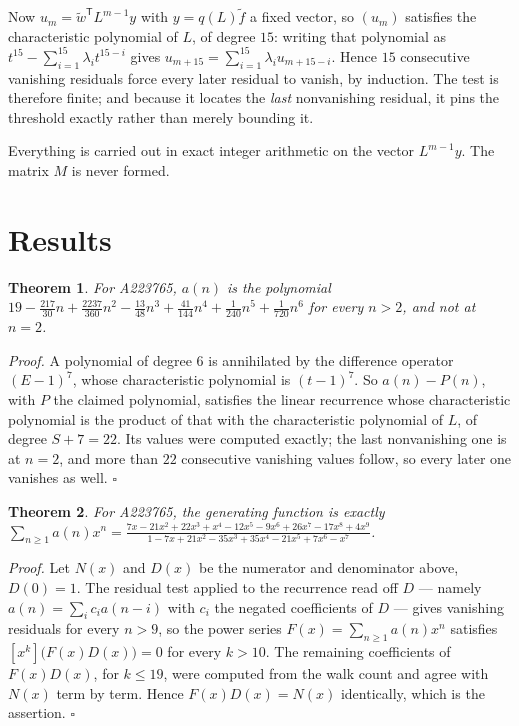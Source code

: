 \documentclass[11pt]{article}
\newtheorem{theorem}{Theorem}
\theoremstyle{definition}
\begin{document}
Now $u_m = \tilde w^{\mathsf T} L^{m-1} y$ with $y = q(L)\tilde f$ a fixed vector, so $(u_m)$ satisfies the characteristic polynomial of $L$, of degree $15$: writing that polynomial as $t^{15} - \sum_{i=1}^{15} \lambda_i t^{15-i}$ gives $u_{m+15} = \sum_{i=1}^{15} \lambda_i u_{m+15-i}$. Hence $15$ consecutive vanishing residuals force every later residual to vanish, by induction. The test is therefore finite; and because it locates the {\itshape last} nonvanishing residual, it pins the threshold exactly rather than merely bounding it.

Everything is carried out in exact integer arithmetic on the vector $L^{m-1}y$. The matrix $M$ is never formed.

\section{Results}

\begin{theorem} For A223765, $a(n)$ is the polynomial $19 - \frac{217}{30}n + \frac{2237}{360}n^{2} - \frac{13}{48}n^{3} + \frac{41}{144}n^{4} + \frac{1}{240}n^{5} + \frac{1}{720}n^{6}$ for every $n > 2$, and not at $n = 2$.\end{theorem}

{\itshape Proof.} A polynomial of degree $6$ is annihilated by the difference operator $(E-1)^{7}$, whose characteristic polynomial is $(t-1)^{7}$. So $a(n) - P(n)$, with $P$ the claimed polynomial, satisfies the linear recurrence whose characteristic polynomial is the product of that with the characteristic polynomial of $L$, of degree $S + 7 = 22$. Its values were computed exactly; the last nonvanishing one is at $n = 2$, and more than $22$ consecutive vanishing values follow, so every later one vanishes as well. $\square$

\begin{theorem} For A223765, the generating function is exactly $\sum_{n\ge 1} a(n)x^n = \frac{7x - 21x^{2} + 22x^{3} + x^{4} - 12x^{5} - 9x^{6} + 26x^{7} - 17x^{8} + 4x^{9}}{1 - 7x + 21x^{2} - 35x^{3} + 35x^{4} - 21x^{5} + 7x^{6} - x^{7}}$.\end{theorem}

{\itshape Proof.} Let $N(x)$ and $D(x)$ be the numerator and denominator above, $D(0)=1$. The residual test applied to the recurrence read off $D$ --- namely $a(n) = \sum_i c_i a(n-i)$ with $c_i$ the negated coefficients of $D$ --- gives vanishing residuals for every $n > 9$, so the power series $F(x)=\sum_{n\ge 1}a(n)x^n$ satisfies $[x^k]\bigl(F(x)D(x)\bigr) = 0$ for every $k > 10$. The remaining coefficients of $F(x)D(x)$, for $k \le 19$, were computed from the walk count and agree with $N(x)$ term by term. Hence $F(x)D(x) = N(x)$ identically, which is the assertion. $\square$
\end{document}
